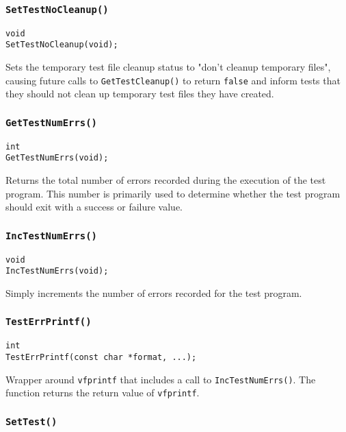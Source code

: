 \documentclass[../HDF5_RFC.tex]{subfiles}
\begin{document}
\subsubsection{\texttt{SetTestNoCleanup()}}

\begin{verbatim}
void
SetTestNoCleanup(void);
\end{verbatim}

Sets the temporary test file cleanup status to "don't cleanup temporary files", causing future calls to \texttt{GetTestCleanup()} to return \texttt{false} and inform tests that they should not clean up temporary test files they have created.

\subsubsection{\texttt{GetTestNumErrs()}}

\begin{verbatim}
int
GetTestNumErrs(void);
\end{verbatim}

Returns the total number of errors recorded during the execution of the test program. This number is
primarily used to determine whether the test program should exit with a success or failure value.

\subsubsection{\texttt{IncTestNumErrs()}}

\begin{verbatim}
void
IncTestNumErrs(void);
\end{verbatim}

Simply increments the number of errors recorded for the test program.

\subsubsection{\texttt{TestErrPrintf()}}

\begin{verbatim}
int
TestErrPrintf(const char *format, ...);
\end{verbatim}

Wrapper around \texttt{vfprintf} that includes a call to \texttt{IncTestNumErrs()}. The function
returns the return value of \texttt{vfprintf}.

\subsubsection{\texttt{SetTest()}}
\end{document}
